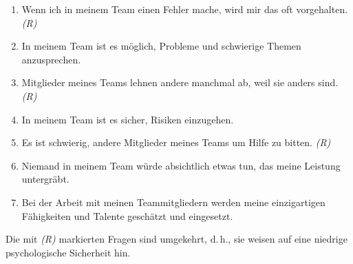\begin{enumerate}
  \item Wenn ich in meinem Team einen Fehler mache, wird mir das oft vorgehalten. \emph{(R)}
  \item In meinem Team ist es möglich, Probleme und schwierige Themen anzusprechen.
  \item Mitglieder meines Teams lehnen andere manchmal ab, weil sie anders sind. \emph{(R)}
  \item In meinem Team ist es sicher, Risiken einzugehen.
  \item Es ist schwierig, andere Mitglieder meines Teams um Hilfe zu bitten. \emph{(R)}
  \item Niemand in meinem Team würde absichtlich etwas tun, das meine Leistung untergräbt.
  \item Bei der Arbeit mit meinen Teammitgliedern werden meine einzigartigen Fähigkeiten und Talente geschätzt und eingesetzt.
\end{enumerate}

Die mit \emph{(R)} markierten Fragen sind umgekehrt, d.\,h., sie weisen auf eine niedrige psychologische Sicherheit hin.
